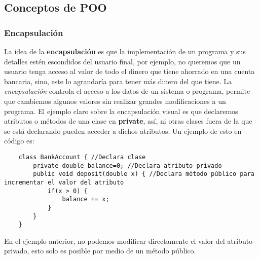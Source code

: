 \subsection{Conceptos de POO}
\subsubsection{Encapsulación}
La idea de la \textbf{encapsulación} es que la implementación de un programa y sus detalles estén escondidos del usuario final, por ejemplo, no queremos que un usuario tenga acceso al valor de todo el dinero que tiene ahorrado en una cuenta bancaria, sino, este lo agrandaría para tener más dinero del que tiene. La \textit{encapsulación} controla el acceso a los datos de un sistema o programa, permite que cambiemos algunos valores sin realizar grandes modificaciones a un programa. El ejemplo claro sobre la encapsulación visual es que declaremos atributos o métodos de una clase en \textbf{private}, así, ni otras clases fuera de la que se está declarando pueden acceder a dichos atributos. Un ejemplo de esto en código es:
\begin{lstlisting}
    class BankAccount { //Declara clase
        private double balance=0; //Declara atributo privado
        public void deposit(double x) { //Declara método público para incrementar el valor del atributo
            if(x > 0) {
                balance += x;
            }
        }
    }
\end{lstlisting}
En el ejemplo anterior, no podemos modificar directamente el valor del atributo privado, esto solo es posible por medio de un método público.


